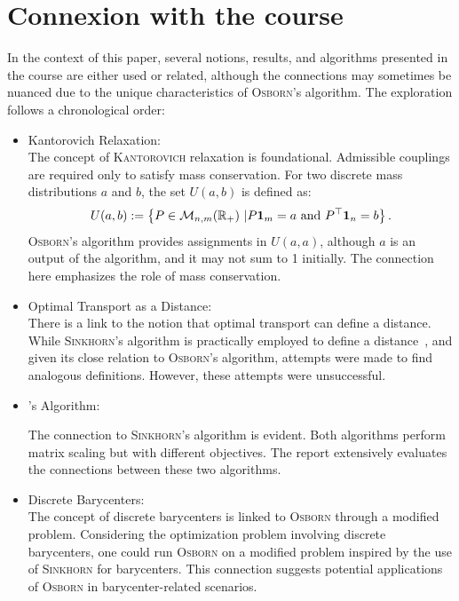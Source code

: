 \section{Connexion with the course}

In the context of this paper, several notions, results, and algorithms presented in the course are either used or related, although the connections may sometimes be nuanced due to the unique characteristics of \textsc{Osborn}'s algorithm. The exploration follows a chronological order:

\begin{itemize}
    \item Kantorovich Relaxation:\\
    
    The concept of \textsc{Kantorovich} relaxation is foundational. Admissible couplings are required only to satisfy mass conservation. For two discrete mass distributions \(a\) and \(b\), the set \(U(a,b)\) is defined as:
    \[
    U(a,b) := \left\{P \in \mathcal M_{n,m}(\R_+) \ | P\mathbf{1}_m = a \ \text{and}\ P^\top\mathbf{1}_n = b \right\}.
    \]
    \textsc{Osborn}'s algorithm provides assignments in \(U(a,a)\), although \(a\) is an output of the algorithm, and it may not sum to 1 initially. The connection here emphasizes the role of mass conservation.
    \item Optimal Transport as a Distance:\\
    
    There is a link to the notion that optimal transport can define a distance. While \textsc{Sinkhorn}'s algorithm is practically employed to define a distance~\cite{NIPS2013_af21d0c9, qian2016non}, and given its close relation to \textsc{Osborn}'s algorithm, attempts were made to find analogous definitions. However, these attempts were unsuccessful.
    \item {}'s Algorithm:
    
    The connection to \textsc{Sinkhorn}'s algorithm is evident. Both algorithms perform matrix scaling but with different objectives. The report extensively evaluates the connections between these two algorithms.
    \item Discrete Barycenters:\\
    
    The concept of discrete barycenters is linked to \textsc{Osborn} through a modified problem. Considering the optimization problem involving discrete barycenters, one could run \textsc{Osborn} on a modified problem inspired by the use of \textsc{Sinkhorn} for barycenters. This connection suggests potential applications of \textsc{Osborn} in barycenter-related scenarios.


\end{itemize}
